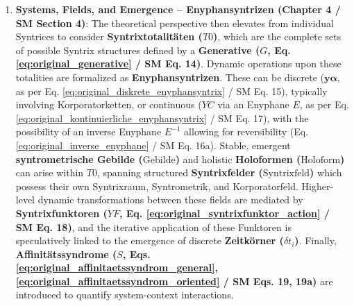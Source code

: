 \documentclass[
    12pt,              %
    a4paper,           %
    headings=normal,   %
    twoside=true,      %
    BCOR=8mm,          %
]{scrbook}
\newcommand{\syntrixtotalitaet}{T0}
\newcommand{\generative}{G}
\newcommand{\syntrixfeld}{\text{Syntrixfeld}}
\newcommand{\diskreteEnyphansyntrix}{\bm{y\alpha}}
\newcommand{\kontinuierlicheEnyphansyntrix}{YC}
\newcommand{\enyphane}{E}
\newcommand{\syntrometrischesGebilde}{\text{Gebilde}}
\newcommand{\holoform}{\text{Holoform}}
\newcommand{\syntrixfunktor}{YF}
\newcommand{\zeitkorn}{\delta t_i}
\newcommand{\affinitaetssyndrom}{S}
\begin{document}
\begin{enumerate}
    \item \textbf{Systems, Fields, and Emergence – Enyphansyntrizen (Chapter 4 / SM Section 4)}: The theoretical perspective then elevates from individual Syntrices to consider \textbf{Syntrixtotalitäten (\( \syntrixtotalitaet \))}, which are the complete sets of possible Syntrix structures defined by a \textbf{Generative (\( \generative \), Eq. \eqref{eq:original_generative} / SM Eq. 14)}. Dynamic operations upon these totalities are formalized as \textbf{Enyphansyntrizen}. These can be discrete (\( \diskreteEnyphansyntrix \), as per Eq. \eqref{eq:original_diskrete_enyphansyntrix} / SM Eq. 15), typically involving Korporatorketten, or continuous (\( \kontinuierlicheEnyphansyntrix \) via an Enyphane \( \enyphane \), as per Eq. \eqref{eq:original_kontinuierliche_enyphansyntrix} / SM Eq. 17), with the possibility of an inverse Enyphane \( \enyphane^{-1} \) allowing for reversibility (Eq. \eqref{eq:original_inverse_enyphane} / SM Eq. 16a). Stable, emergent \textbf{syntrometrische Gebilde (\(\syntrometrischesGebilde\))} and holistic \textbf{Holoformen (\(\holoform\))} can arise within \( \syntrixtotalitaet \), spanning structured \textbf{Syntrixfelder (\(\syntrixfeld\))} which possess their own Syntrixraum, Syntrometrik, and Korporatorfeld. Higher-level dynamic transformations between these fields are mediated by \textbf{Syntrixfunktoren (\( \syntrixfunktor \), Eq. \eqref{eq:original_syntrixfunktor_action} / SM Eq. 18)}, and the iterative application of these Funktoren is speculatively linked to the emergence of discrete \textbf{Zeitkörner (\(\zeitkorn\))}. Finally, \textbf{Affinitätssyndrome (\( \affinitaetssyndrom \), Eqs. \eqref{eq:original_affinitaetssyndrom_general}, \eqref{eq:original_affinitaetssyndrom_oriented} / SM Eqs. 19, 19a)} are introduced to quantify system-context interactions.


\end{enumerate}
\end{document}
